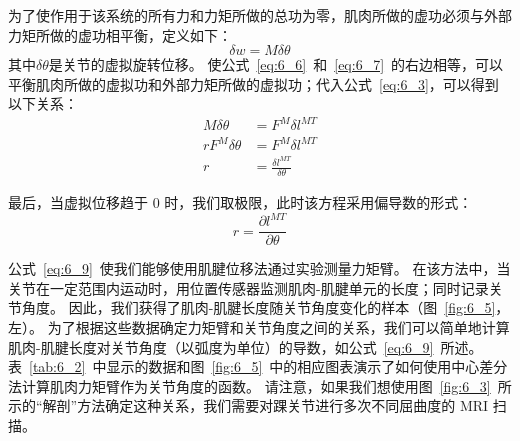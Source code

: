 为了使作用于该系统的所有力和力矩所做的总功为零，肌肉所做的虚功必须与外部力矩所做的虚功相平衡，定义如下：
%
\begin{equation}
	\delta w = M \delta \theta
	\label{eq:6_7}
\end{equation}
%
其中$\delta \theta$是关节的虚拟旋转位移。
使公式~\ref{eq:6_6}~和~\ref{eq:6_7}~的右边相等，可以平衡肌肉所做的虚拟功和外部力矩所做的虚拟功；代入公式~\ref{eq:6_3}，可以得到以下关系：
%
\begin{equation}
	\begin{aligned}
		M \delta \theta & = F^M \delta l^{MT} \\
		r F^M \delta \theta & = F^M \delta l^{MT} \\
		r & = \frac{\delta l^{MT}}{\delta \theta}
	\end{aligned}
	\label{eq:6_8}
\end{equation}


最后，当虚拟位移趋于 0 时，我们取极限，此时该方程采用偏导数的形式：
%
\begin{equation}
	r = \frac{\partial l^{MT}}{\partial \theta}
	\label{eq:6_9}
\end{equation}

公式~\ref{eq:6_9}~使我们能够使用肌腱位移法通过实验测量力矩臂。
在该方法中，当关节在一定范围内运动时，用位置传感器监测肌肉-肌腱单元的长度；同时记录关节角度。
因此，我们获得了肌肉-肌腱长度随关节角度变化的样本（图~\ref{fig:6_5}，左）。
为了根据这些数据确定力矩臂和关节角度之间的关系，我们可以简单地计算肌肉-肌腱长度对关节角度（以弧度为单位）的导数，如公式~\ref{eq:6_9}~所述。
表~\ref{tab:6_2}~中显示的数据和图~\ref{fig:6_5}~中的相应图表演示了如何使用中心差分法计算肌肉力矩臂作为关节角度的函数。
请注意，如果我们想使用图~\ref{fig:6_3}~所示的“解剖”方法确定这种关系，我们需要对踝关节进行多次不同屈曲度的 MRI 扫描。


